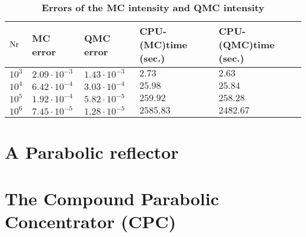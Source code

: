 \begin{table}[h!] \label{tab:table_tir_triangulation}
\centering
\caption{\bf Errors of the MC intensity and QMC intensity}
\begin{tabular}{lllll}
 \hline  $\textrm{Nr}$\;  & MC error & QMC error & CPU-(MC)time (sec.) & CPU-(QMC)time (sec.)\\
  \hline 
 $10^3$ & $2.09\cdot 10^{-3}$  & $1.43\cdot10^{-3}$  & $2.73$  & $2.63$  \\
$10^4$  & $6.42\cdot 10^{-4}$  & $3.03\cdot 10^{-4}$  & $25.98$  & $25.84$   \\
$10^5$  & $1.92\cdot 10^{-4}$  & $5.82\cdot 10^{-5}$  & $259.92$  & $258.28$  \\
 $10^6$  & $7.45\cdot 10^{-5}$  & $1.28\cdot 10^{-5}$  & $2585.83$ & $2482.67$  \\
 \hline
 \end{tabular}
 \label{tab:qmc_error_triangulation}
 \end{table}



\section{A Parabolic reflector}

\section{The Compound Parabolic Concentrator (CPC)}